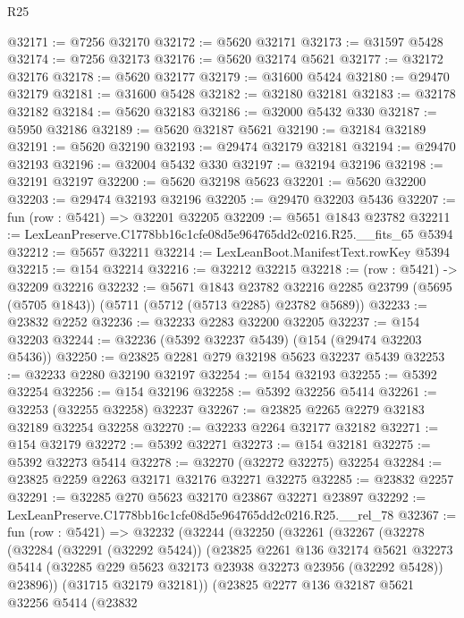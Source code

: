 \begin{lexlean}{R25}
\begin{coremodule}
@32171 := @7256 @32170
@32172 := @5620 @32171
@32173 := @31597 @5428
@32174 := @7256 @32173
@32176 := @5620 @32174 @5621
@32177 := @32172 @32176
@32178 := @5620 @32177
@32179 := @31600 @5424
@32180 := @29470 @32179
@32181 := @31600 @5428
@32182 := @32180 @32181
@32183 := @32178 @32182
@32184 := @5620 @32183
@32186 := @32000 @5432 @330
@32187 := @5950 @32186
@32189 := @5620 @32187 @5621
@32190 := @32184 @32189
@32191 := @5620 @32190
@32193 := @29474 @32179 @32181
@32194 := @29470 @32193
@32196 := @32004 @5432 @330
@32197 := @32194 @32196
@32198 := @32191 @32197
@32200 := @5620 @32198 @5623
@32201 := @5620 @32200
@32203 := @29474 @32193 @32196
@32205 := @29470 @32203 @5436
@32207 := fun (row : @5421) => @32201 @32205
@32209 := @5651 @1843 @23782
@32211 := LexLeanPreserve.C1778bb16c1cfe08d5e964765dd2c0216.R25.__fits_65 @5394
@32212 := @5657 @32211
@32214 := LexLeanBoot.ManifestText.rowKey @5394
@32215 := @154 @32214
@32216 := @32212 @32215
@32218 := (row : @5421) -> @32209 @32216
@32232 := @5671
    @1843
    @23782
    @32216
    @2285
    @23799
    (@5695 (@5705 @1843))
    (@5711 (@5712 (@5713 @2285) @23782 @5689))
@32233 := @23832 @2252
@32236 := @32233 @2283 @32200 @32205
@32237 := @154 @32203
@32244 := @32236 (@5392 @32237 @5439) (@154 (@29474 @32203 @5436))
@32250 := @23825 @2281 @279 @32198 @5623 @32237 @5439
@32253 := @32233 @2280 @32190 @32197
@32254 := @154 @32193
@32255 := @5392 @32254
@32256 := @154 @32196
@32258 := @5392 @32256 @5414
@32261 := @32253 (@32255 @32258) @32237
@32267 := @23825 @2265 @2279 @32183 @32189 @32254 @32258
@32270 := @32233 @2264 @32177 @32182
@32271 := @154 @32179
@32272 := @5392 @32271
@32273 := @154 @32181
@32275 := @5392 @32273 @5414
@32278 := @32270 (@32272 @32275) @32254
@32284 := @23825 @2259 @2263 @32171 @32176 @32271 @32275
@32285 := @23832 @2257
@32291 := @32285 @270 @5623 @32170 @23867 @32271 @23897
@32292 := LexLeanPreserve.C1778bb16c1cfe08d5e964765dd2c0216.R25.__rel_78
@32367 := fun (row : @5421) =>
  @32232
    (@32244
      (@32250
        (@32261
          (@32267
            (@32278
              (@32284
                (@32291 (@32292 @5424))
                (@23825
                  @2261
                  @136
                  @32174
                  @5621
                  @32273
                  @5414
                  (@32285 @229 @5623 @32173 @23938 @32273 @23956 (@32292 @5428))
                  @23896))
              (@31715 @32179 @32181))
            (@23825
              @2277
              @136
              @32187
              @5621
              @32256
              @5414
              (@23832

\end{coremodule}
\end{lexlean}
